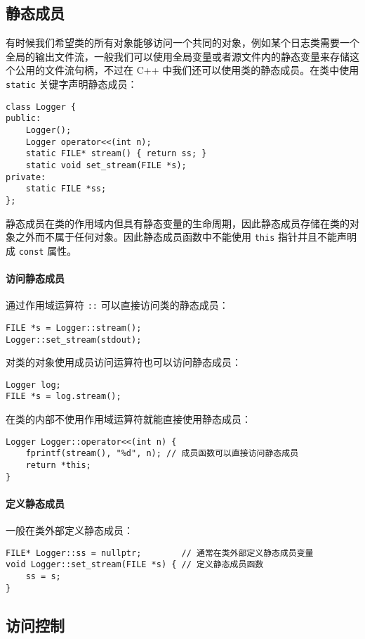 \documentclass[hyperref,UTF8]{article}
\begin{document}
\subsection{静态成员}

有时候我们希望类的所有对象能够访问一个共同的对象，例如某个日志类需要一个全局的输出文件流，一般我们可以使用全局变量或者源文件内的静态变量来存储这个公用的文件流句柄，不过在 C++ 中我们还可以使用类的静态成员。在类中使用 \texttt{static} 关键字声明静态成员：
\begin{lstlisting}
class Logger {
public:
    Logger();
    Logger operator<<(int n);
    static FILE* stream() { return ss; }
    static void set_stream(FILE *s);
private:
    static FILE *ss;
};
\end{lstlisting}
静态成员在类的作用域内但具有静态变量的生命周期，因此静态成员存储在类的对象之外而不属于任何对象。因此静态成员函数中不能使用 \texttt{this} 指针并且不能声明成 \texttt{const} 属性。

\paragraph{访问静态成员}

通过作用域运算符 \texttt{::} 可以直接访问类的静态成员：
\begin{lstlisting}
FILE *s = Logger::stream();
Logger::set_stream(stdout);
\end{lstlisting}
对类的对象使用成员访问运算符也可以访问静态成员：
\begin{lstlisting}
Logger log;
FILE *s = log.stream();
\end{lstlisting}
在类的内部不使用作用域运算符就能直接使用静态成员：
\begin{lstlisting}
Logger Logger::operator<<(int n) {
    fprintf(stream(), "%d", n); // 成员函数可以直接访问静态成员
    return *this;
}
\end{lstlisting}

\paragraph{定义静态成员}

一般在类外部定义静态成员：
\begin{lstlisting}
FILE* Logger::ss = nullptr;        // 通常在类外部定义静态成员变量
void Logger::set_stream(FILE *s) { // 定义静态成员函数
    ss = s;
}
\end{lstlisting}

\subsection{访问控制}
\end{document}
